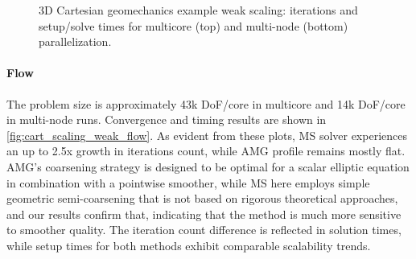 \begin{figure} [htbp]
  \begin{subfigure}[t]{0.48\textwidth}
    \centering
    
  \end{subfigure}
  \hfill
  \begin{subfigure}[t]{0.48\textwidth}
    \centering
    
  \end{subfigure}
  \begin{subfigure}[t]{0.48\textwidth}
    \centering
    
  \end{subfigure}
  \hfill
  \begin{subfigure}[t]{0.48\textwidth}
    \centering
    
  \end{subfigure}
  \caption[3D Cartesian geomechanics example weak scaling]{3D Cartesian geomechanics example weak scaling: iterations and setup/solve times for multicore (top) and multi-node (bottom) parallelization.}
  \label{fig:cart_scaling_weak_mech}
\end{figure}

\paragraph{Flow}
The problem size is approximately 43k DoF/core in multicore and 14k DoF/core in multi-node runs.   Convergence and timing results are shown in \cref{fig:cart_scaling_weak_flow}.   As evident from these plots, MS solver experiences an up to 2.5x growth in iterations count, while AMG profile remains mostly flat.   AMG's coarsening strategy is designed to be optimal for a scalar elliptic equation in combination with a pointwise smoother, while MS here employs simple geometric semi-coarsening that is not based on rigorous theoretical approaches, and our results confirm that, indicating that the method is much more sensitive to smoother quality.   The iteration count difference is reflected in solution times, while setup times for both methods exhibit comparable scalability trends.

